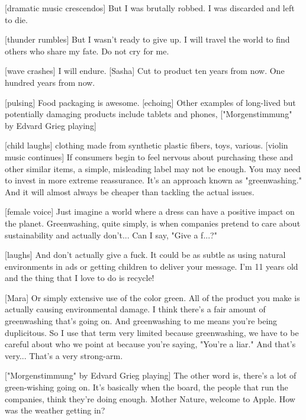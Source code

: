 \documentclass[a4paper]{article}
\begin{document}
	
	[dramatic music crescendos]
	But I was brutally robbed.
	I was discarded and left to die.
	
	
	[thunder rumbles]
	But I wasn't ready to give up.
	I will travel the world
	to find others who share my fate.
	Do not cry for me.
	
	
	[wave crashes]
	I will endure.
	[Sasha] Cut to product ten years from now.
	One hundred years from now.
	
	
	[pulsing]
	Food packaging is awesome. [echoing]
	Other examples of long-lived but potentially damaging products include tablets and phones, ["Morgenstimmung" by Edvard Grieg playing]
	
	
	
	[child laughs]
	clothing made from synthetic plastic fibers,
	toys, various.
	[violin music continues]
	If consumers begin to feel nervous about purchasing these and other similar items, a simple, misleading label may not be enough.
	You may need to invest in more extreme reassurance.
	It's an approach known as "greenwashing."
	And it will almost always be cheaper than tackling the actual issues.
	
	
	
	[female voice] Just imagine a world where a dress can have a positive impact on the planet.
	Greenwashing, quite simply, is when companies pretend to care about sustainability and actually don't... Can I say, "Give a f...?"
	
	
	[laughs]
	And don't actually give a fuck.
	It could be as subtle as using natural environments in ads or getting children to deliver your message.
	I'm 11 years old and the thing that I love to do is recycle!


	[Mara] Or simply extensive use of the color green.
	All of the product you make is actually causing environmental damage.
	I think there's a fair amount of greenwashing that's going on.
	And greenwashing to me means you're being duplicitous.
	So I use that term very limited	because greenwashing, we have to be careful about who we point at because you're saying, "You're a liar."
	And that's very... That's a very strong-arm.
	
	
	
	["Morgenstimmung" by Edvard Grieg playing]
	The other word is, there's a lot of green-wishing going on.
	It's basically when the board, the people that run the companies, think they're doing enough.
	Mother Nature, welcome to Apple.
	How was the weather getting in?
	
	
	
\end{document}
